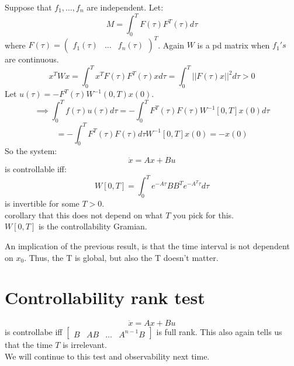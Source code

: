 \documentclass{article}
\begin{document}
Suppose that $f_1,\dots,f_n$ are independent. Let:
\[M=\int_0^TF(\tau)F^T(\tau)d\tau\]
where $F(\tau)=\begin{pmatrix}f_1(\tau)&\dots&f_n(\tau)\end{pmatrix}^T$. Again $W$ is a pd matrix when $f_1's$ are continuous.\\
\[x^TWx=\int_0^Tx^TF(\tau)F^T(\tau)xd\tau=\int_0^T\lvert\lvert F(\tau)x\rvert\rvert^2d\tau>0\]
Let $u(\tau)=-F^T(\tau)W^{-1}(0,T)x(0)$.\\
\[\implies \int_0^Tf(\tau)u(\tau)d\tau=-\int_0^TF^T(\tau)F(\tau)W^{-1}[0,T]x(0)d\tau\]
\[=-\int_0^TF^T(\tau)F(\tau)d\tau W^{-1}[0,T]x(0)=-x(0)\]
So the system:\\
\[\dot{x}=Ax+Bu\]
is controllable iff:
\[W[0,T]=\int_0^Te^{-A\tau}BB^Te^{-A^T\tau}d\tau\]
is invertible for some $T>0$.\\
corollary that this does not depend on what $T$ you pick for this.\\

$W[0,T]$ is the controllability Gramian.

An implication of the previous result, is that the time interval is not dependent on $x_0$. Thus, the T is global, but also the T doesn't matter.\\

\section{Controllability rank test}
\[\dot{x}=Ax+Bu\]
is controllabe iff $\begin{bmatrix}B & AB &\dots &A^{n-1}B\end{bmatrix}$ is full rank. This also again tells us that the time $T$ is irrelevant.\\


We will continue to this test and observability next time.
\end{document}
